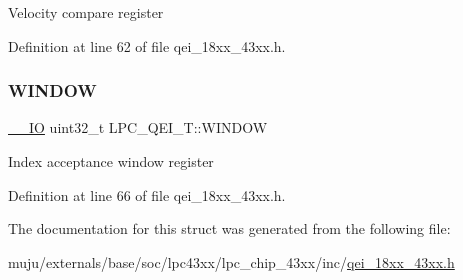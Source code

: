 Velocity compare register 

Definition at line 62 of file qei\+\_\+18xx\+\_\+43xx.\+h.

\mbox{\label{struct_l_p_c___q_e_i___t_af75222d15c3a2744586a5f27a0549c18}} 
\subsubsection{\texorpdfstring{W\+I\+N\+D\+OW}{WINDOW}}
{\footnotesize\ttfamily \hyperlink{core__sc300_8h_aec43007d9998a0a0e01faede4133d6be}{\+\_\+\+\_\+\+IO} uint32\+\_\+t L\+P\+C\+\_\+\+Q\+E\+I\+\_\+\+T\+::\+W\+I\+N\+D\+OW}

Index acceptance window register 

Definition at line 66 of file qei\+\_\+18xx\+\_\+43xx.\+h.



The documentation for this struct was generated from the following file\+:\begin{DoxyCompactItemize}
\item 
muju/externals/base/soc/lpc43xx/lpc\+\_\+chip\+\_\+43xx/inc/\hyperlink{qei__18xx__43xx_8h}{qei\+\_\+18xx\+\_\+43xx.\+h}\end{DoxyCompactItemize}
